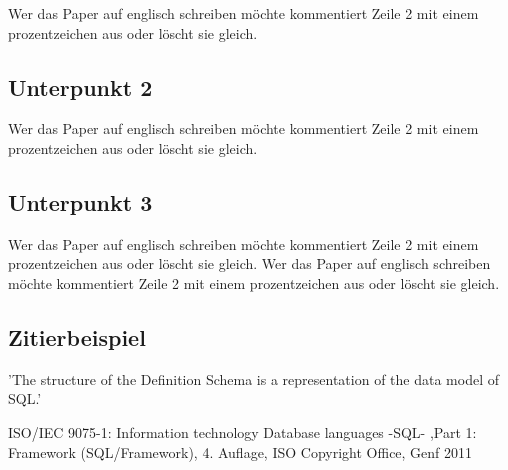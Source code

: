 \documentclass[12pt,twocolumn,twoside]{conference}
\begin{document}
Wer das Paper auf englisch schreiben möchte kommentiert Zeile 2 mit einem prozentzeichen aus oder löscht sie gleich.
\subsection{Unterpunkt 2}
Wer das Paper auf englisch schreiben möchte kommentiert Zeile 2 mit einem prozentzeichen aus oder löscht sie gleich.
\subsection{Unterpunkt 3}
Wer das Paper auf englisch schreiben möchte kommentiert Zeile 2 mit einem prozentzeichen aus oder löscht sie gleich. Wer das Paper auf englisch schreiben möchte kommentiert Zeile 2 mit einem prozentzeichen aus oder löscht sie gleich.
\subsection{Zitierbeispiel}
'The structure of the Definition Schema is a representation of the data model of SQL.' \cite{ISO9075-1:2011}

\newpage
\begin{thebibliography}{99}
	
	ISO/IEC 9075-1: Information technology
	Database languages -SQL- ,Part 1: Framework
	(SQL/Framework), 4. Auflage, ISO Copyright Office,
	Genf 2011
	
	
\end{thebibliography}
\end{document}
